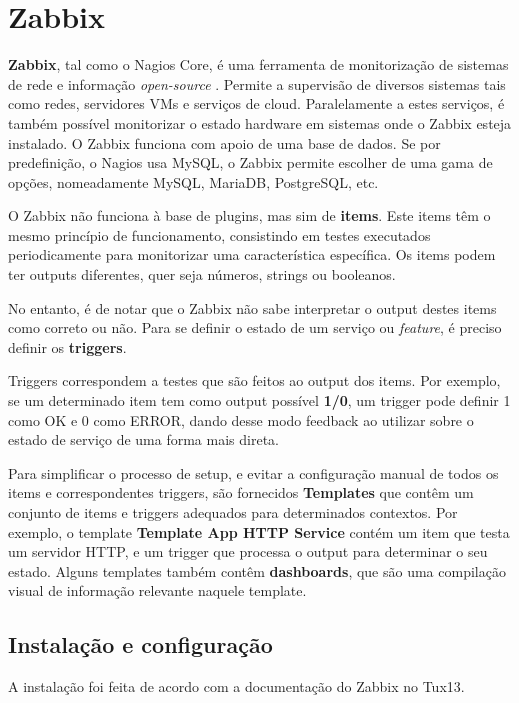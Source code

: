 \chapter{Zabbix}

\textbf{Zabbix}, tal como o Nagios Core, é uma ferramenta de monitorização de sistemas de rede e informação \textit{open-source} \cite{Zabbix}.
Permite a supervisão de diversos sistemas tais como redes, servidores VMs e serviços de cloud.
Paralelamente a estes serviços, é também possível monitorizar o estado hardware em sistemas onde o Zabbix esteja instalado.
O Zabbix funciona com apoio de uma base de dados. 
Se por predefinição, o Nagios usa MySQL, o Zabbix permite escolher de uma gama de opções, nomeadamente MySQL, MariaDB, PostgreSQL, etc.

O Zabbix não funciona à base de plugins, mas sim de \textbf{items}.
Este items têm o mesmo princípio de funcionamento, consistindo em testes executados periodicamente para monitorizar uma característica específica.
Os items podem ter outputs diferentes, quer seja números, strings ou booleanos.

No entanto, é de notar que o Zabbix não sabe interpretar o output destes items como correto ou não.
Para se definir o estado de um serviço ou \textit{feature}, é preciso definir os \textbf{triggers}.

Triggers correspondem a testes que são feitos ao output dos items.
Por exemplo, se um determinado item tem como output possível \textbf{1/0},
um trigger pode definir 1 como OK e 0 como ERROR, dando desse modo feedback ao utilizar sobre o estado de serviço de uma forma mais direta.

Para simplificar o processo de setup, e evitar a configuração manual de todos os items e correspondentes triggers,
são fornecidos \textbf{Templates} que contêm um conjunto de items e triggers adequados para determinados contextos.
Por exemplo, o template \textbf{Template App HTTP Service} contém um item que testa um servidor HTTP, e um trigger que processa o output para determinar o seu estado.
Alguns templates também contêm \textbf{dashboards}, que são uma compilação visual de informação relevante naquele template.

\pagebreak

\section{Instalação e configuração}

A instalação foi feita de acordo com a documentação do Zabbix \cite{Zabbix_setup} no Tux13.

